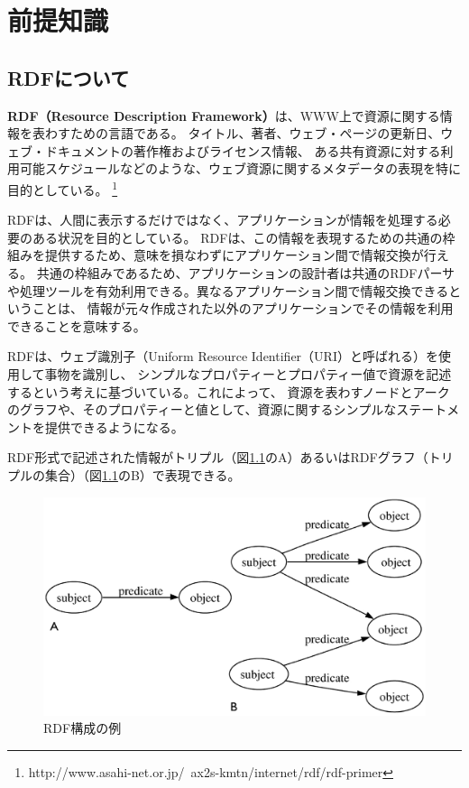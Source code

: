 ﻿%
\chapter{前提知識}
\label{knowlegde:top}

\section{RDFについて}
\label{knowlegde:rdf}

\textbf{RDF（Resource Description Framework）}は、WWW上で資源に関する情報を表わすための言語である。
タイトル、著者、ウェブ・ページの更新日、ウェブ・ドキュメントの著作権およびライセンス情報、
ある共有資源に対する利用可能スケジュールなどのような、ウェブ資源に関するメタデータの表現を特に目的としている。
\footnote{http://www.asahi-net.or.jp/~ax2s-kmtn/internet/rdf/rdf-primer}

RDFは、人間に表示するだけではなく、アプリケーションが情報を処理する必要のある状況を目的としている。
RDFは、この情報を表現するための共通の枠組みを提供するため、意味を損なわずにアプリケーション間で情報交換が行える。
共通の枠組みであるため、アプリケーションの設計者は共通のRDFパーサや処理ツールを有効利用できる。異なるアプリケーション間で情報交換できるということは、
情報が元々作成された以外のアプリケーションでその情報を利用できることを意味する。

RDFは、ウェブ識別子（Uniform Resource Identifier（URI）と呼ばれる）を使用して事物を識別し、
シンプルなプロパティーとプロパティー値で資源を記述するという考えに基づいている。これによって、
資源を表わすノードとアークのグラフや、そのプロパティーと値として、資源に関するシンプルなステートメントを提供できるようになる。

RDF形式で記述された情報がトリプル（図\ref{fig:rdf_triple}のA）あるいはRDFグラフ（トリプルの集合）（図\ref{fig:rdf_triple}のB）で表現できる。

\begin{figure}[h!]
 	\begin{center}
 		\includegraphics[width=135mm]{./images/rdf_sample.eps}
 		\caption{RDF構成の例}
 		\label{fig:rdf_triple}
 	\end{center}
\end{figure}

